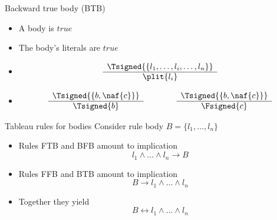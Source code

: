 \begin{frame}{Backward true body (BTB)}
\begin{itemize}
\item {} A body is $\mathit{true}$
\item {} The body's literals are $\mathit{true}$
\item {}
\[
\begin{array}{c}
\Tsigned{\{l_1,\dots,l_i,\dots,l_n\}} \\\hline
\plit{l_i}
\end{array}
\]
\item<2-> 
\[
\begin{array}{c}
\Tsigned{\{b, \naf{c}\}} \\\hline
\Tsigned{b}
\end{array}
\qquad\qquad
\begin{array}{c}
\Tsigned{\{b, \naf{c}\}} \\\hline
\Fsigned{c}
\end{array}
\hfill
\]
\end{itemize}
\end{frame}
\begin{frame}{Tableau rules for bodies}
Consider rule body $B=\{l_1,\dots,l_n\}$
\bigskip
\begin{itemize}
\item<1-> Rules FTB and BFB amount to implication
  \[
  l_1 \wedge \dots \wedge l_n \rightarrow B
  \]
\item<2-> Rules FFB and BTB amount to implication
  \[
  B \rightarrow l_1 \wedge \dots \wedge l_n
  \]
\item<3-> Together they yield
  \[
  B \leftrightarrow l_1 \wedge \dots \wedge l_n
  \]
\end{itemize}
\end{frame}
